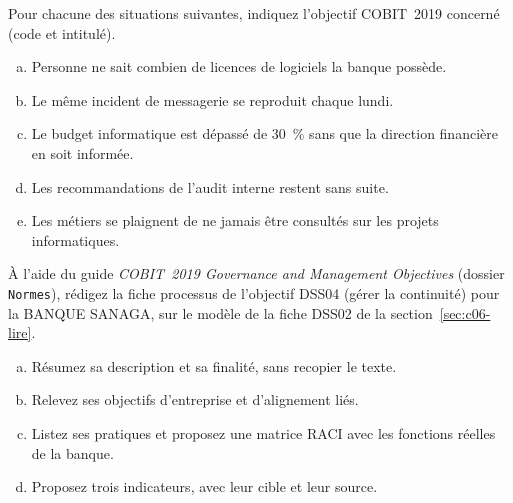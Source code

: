 \bigskip

\begin{boxexo}[title={\ding{45}\quad Exercice~6.1. Trouver l'objectif \niveaubase}]
Pour chacune des situations suivantes, indiquez l'objectif COBIT~2019
concerné (code et intitulé).
\begin{enumerate}[(a)]
    \item Personne ne sait combien de licences de logiciels la banque
          possède.
    \item Le même incident de messagerie se reproduit chaque lundi.
    \item Le budget informatique est dépassé de 30~\% sans que la direction
          financière en soit informée.
    \item Les recommandations de l'audit interne restent sans suite.
    \item Les métiers se plaignent de ne jamais être consultés sur les
          projets informatiques.
\end{enumerate}
\end{boxexo}

\begin{boxexo}[title={\ding{45}\quad Exercice~6.2. La fiche processus de DSS04 \niveaumoyen}]
À l'aide du guide \textit{COBIT~2019 Governance and Management Objectives}
(dossier \texttt{Normes}), rédigez la fiche processus de l'objectif DSS04
(gérer la continuité) pour la BANQUE SANAGA, sur le modèle de la fiche
DSS02 de la section~\ref{sec:c06-lire}.
\begin{enumerate}[(a)]
    \item Résumez sa description et sa finalité, sans recopier le texte.
    \item Relevez ses objectifs d'entreprise et d'alignement liés.
    \item Listez ses pratiques et proposez une matrice RACI avec les
          fonctions réelles de la banque.
    \item Proposez trois indicateurs, avec leur cible et leur source.
\end{enumerate}
\end{boxexo}

